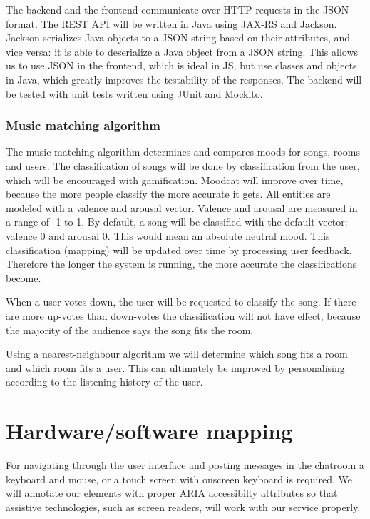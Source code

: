 \par
The backend and the frontend communicate over \Gls{HTTP} requests in the \Gls{JSON} format.
The REST API will be written in Java using JAX-RS and Jackson.
Jackson serializes Java objects to a JSON string based on their attributes, and vice versa: it is able to deserialize a Java object from a JSON string.
This allows us to use JSON in the frontend, which is ideal in \Gls{JS}, but use classes and objects in Java, which greatly improves the testability of the responses.
The backend will be tested with unit tests written using JUnit and Mockito.

\subsubsection{Music matching algorithm}\label{MatchingAlgorithm}
The music matching algorithm determines and compares moods for songs, rooms and users.
The classification of songs will be done by classification from the user, which will be encouraged with gamification.
Moodcat will improve over time, because the more people classify the more accurate it gets.
All entities are modeled with a valence and arousal vector. Valence and arousal are measured in a range of -1 to 1. By default, a song will be classified with the default vector: valence 0 and arousal 0. This would mean an absolute neutral mood. This classification (mapping) will be updated over time by processing user feedback. Therefore the longer the system is running, the more accurate the classifications become.

When a user votes down, the user will be requested to classify the song.
If there are more up-votes than down-votes the classification will not have effect, because the majority of the audience says the song fits the room.

Using a nearest-neighbour algorithm we will determine which song fits a room and which room fits a user.
This can ultimately be improved by personalising according to the listening history of the user.

\section{Hardware/software mapping}
For navigating through the user interface and posting messages in the chatroom a keyboard and mouse, or a touch screen with onscreen keyboard is required.
We will annotate our elements with proper \Gls{ARIA} accessibilty attributes so that assistive technologies, such as screen readers, will work with our service properly.

